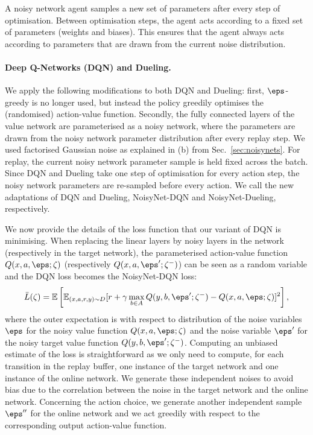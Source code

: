 \documentclass{article}
\newcommand{\algoinit}{NoisyNet}
\begin{document}
A noisy network agent samples a new set of parameters after every step of optimisation.
Between optimisation steps, the agent acts according to a fixed set of parameters (weights and biases).
This ensures that the agent always acts according to parameters that are drawn from the current noise distribution.


\paragraph{Deep Q-Networks (DQN) and Dueling.}
We apply the following modifications to both  DQN and Dueling: first, $\eps$-greedy is no longer used, but instead the policy greedily optimises the (randomised) action-value function.
Secondly, the fully connected layers of the value network are parameterised as a noisy network, where the parameters are drawn from the noisy network parameter distribution after every replay step. We used factorised Gaussian noise as explained in (b) from Sec.~\ref{sec:noisynets}.
For replay, the current noisy network parameter sample is held fixed across the batch.
Since DQN and Dueling take one step of optimisation for every action step, the noisy network parameters are re-sampled before every action.
We call the new adaptations  of DQN and Dueling, \algoinit{}-DQN and \algoinit{}-Dueling, respectively.

We now provide the details of the loss function that our variant of DQN is minimising.  When replacing the linear layers by noisy layers in the network (respectively in the target network), the parameterised action-value function $Q(x,a,\eps;\zeta)$ (respectively $Q(x,a,\eps';\zeta^-)$) can be seen as a random variable and the DQN loss becomes the \algoinit{}-DQN loss:
 \begin{equation}
 \bar L(\zeta)=\mathbb{E}\left[\mathbb{E}_{(x,a,r,y)\sim D}[r+ \gamma \max_{b\in A}Q(y,b,\eps';\zeta^-)-Q(x,a,\eps;\zeta)]^2\right],
 \label{eq:Noisy.DQN.loss}
 \end{equation}
\noindent where the outer expectation is with respect to distribution of the noise variables $\eps$ for the noisy value function $Q(x,a,\eps;\zeta)$ and the noise variable $\eps'$ for the noisy target value function $Q(y,b,\eps';\zeta^-)$.
 Computing an unbiased estimate of the loss is straightforward as we only need to compute, for each transition in the replay buffer, one instance of the target network and one instance of the online network. We generate these independent noises to avoid bias due to the correlation between the noise in the target network and the online network. Concerning the action choice, we generate another independent sample  $\eps''$ for the online network and we act greedily with respect to the corresponding  output action-value function. 
\end{document}
